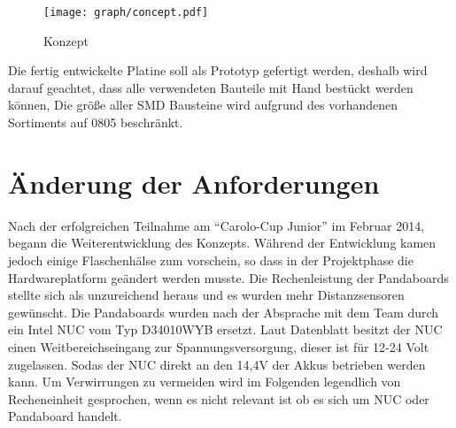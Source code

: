 \begin{figure}[H]
\centering
\texttt{[image: graph/concept.pdf]}\\
\caption{Konzept}
\label{fig:konzept}
\end{figure}


Die fertig entwickelte Platine soll als Prototyp gefertigt werden, deshalb wird darauf geachtet, dass alle verwendeten Bauteile mit Hand bestückt werden können,
Die größe aller SMD Bausteine wird aufgrund des vorhandenen Sortiments auf 0805 beschränkt.





\section{Änderung der Anforderungen}
Nach der erfolgreichen Teilnahme am ``Carolo-Cup Junior'' im Februar 2014, begann die Weiterentwicklung des Konzepts. Während der Entwicklung kamen jedoch
einige Flaschenhälse zum vorschein, so dass in der Projektphase die Hardwareplatform geändert werden musste. Die Rechenleistung der Pandaboards stellte sich
als unzureichend heraus und es wurden mehr Distanzsensoren gewünscht. Die Pandaboards wurden nach der Absprache mit dem Team durch ein Intel NUC vom Typ
D34010WYB ersetzt. Laut Datenblatt \cite{datasheet-nuc} besitzt der NUC einen Weitbereichseingang zur Spannungsversorgung, dieser ist für 12-24 Volt zugelassen.
Sodas der NUC direkt an den 14,4V der Akkus betrieben werden kann.  Um Verwirrungen zu vermeiden wird im Folgenden legendlich von Recheneinheit gesprochen, wenn
es nicht relevant ist ob es sich um NUC oder Pandaboard handelt.
























